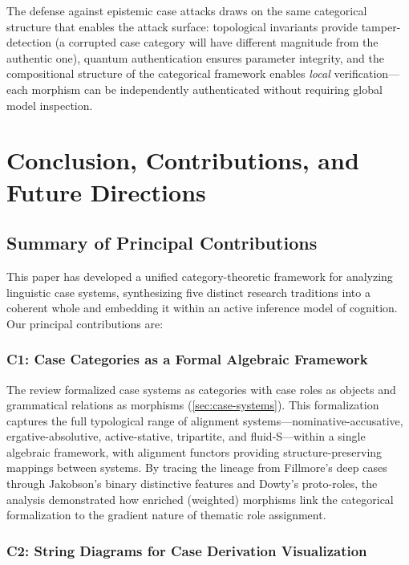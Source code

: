 \documentclass[
]{article}
\numberwithin{equation}{section}
\begin{document}
The defense against epistemic case attacks draws on the same categorical
structure that enables the attack surface: topological invariants
provide tamper-detection (a corrupted case category will have different
magnitude from the authentic one), quantum authentication ensures
parameter integrity, and the compositional structure of the categorical
framework enables \emph{local} verification---each morphism can be
independently authenticated without requiring global model inspection.

\newpage

\section{Conclusion, Contributions, and Future
Directions}\label{sec:conclusion}

\subsection{Summary of Principal
Contributions}\label{summary-of-principal-contributions}

This paper has developed a unified category-theoretic framework for
analyzing linguistic case systems, synthesizing five distinct research
traditions into a coherent whole and embedding it within an active
inference model of cognition. Our principal contributions are:

\subsubsection{C1: Case Categories as a Formal Algebraic
Framework}\label{c1-case-categories-as-a-formal-algebraic-framework}

The review formalized case systems as categories with case roles as
objects and grammatical relations as morphisms
(\autoref{sec:case-systems}). This formalization captures the full
typological range of alignment systems---nominative-accusative,
ergative-absolutive, active-stative, tripartite, and fluid-S---within a
single algebraic framework, with alignment functors providing
structure-preserving mappings between systems. By tracing the lineage
from Fillmore's \citeyearpar{fillmore1968case} deep cases through
Jakobson's binary distinctive features and Dowty's
\citeyearpar{dowty1991thematic} proto-roles, the analysis demonstrated
how enriched (weighted) morphisms link the categorical formalization to
the gradient nature of thematic role assignment.

\subsubsection{C2: String Diagrams for Case Derivation
Visualization}\label{c2-string-diagrams-for-case-derivation-visualization}
\end{document}
